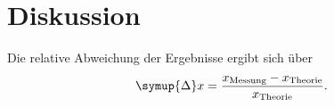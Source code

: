 \section{Diskussion}
\label{sec:Diskussion}
Die relative Abweichung der Ergebnisse ergibt sich über
\begin{equation}\label{eqn:abweichung}
  \symup{\Delta}x = \frac{x_{\text{Messung}} - x_{\text{Theorie}}}{x_{\text{Theorie}}}.
\end{equation}

